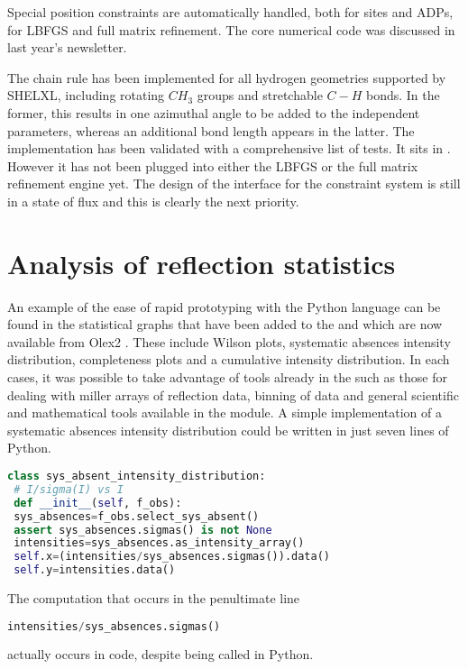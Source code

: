 \documentclass[12pt]{article}
\begin{document}
Special position constraints are automatically handled, both for sites and ADPs, for LBFGS and full matrix refinement. The core numerical code was discussed in last year's \cctbx newsletter.

The chain rule has been implemented for all hydrogen geometries supported by SHELXL, including rotating $CH_3$ groups and stretchable $C-H$ bonds. In the former, this results in one azimuthal angle to be added to the independent parameters, whereas an additional bond length appears in the latter. The implementation has been validated with a comprehensive list of tests. It sits in . However it has not been plugged into either the LBFGS or the full matrix refinement engine yet. The design of the interface for the constraint system is still in a state of flux and this is clearly the next priority.


\section{Analysis of reflection statistics}

An example of the ease of rapid prototyping with the Python language can be found in the statistical graphs that have been added to the \cctbx and which are now available from Olex2 \cite{Dolomanov:2009}. These include Wilson plots, systematic absences intensity distribution, completeness plots and a cumulative intensity distribution. In each cases, it was possible to take advantage of tools already in the \cctbx such as those for dealing with miller arrays of reflection data, binning of data and general scientific and mathematical tools available in the \scitbx module.
A simple implementation of a systematic absences intensity distribution could be written in just seven lines of Python.

\begin{lstlisting}[language=Python]
class sys_absent_intensity_distribution: 
 # I/sigma(I) vs I
 def __init__(self, f_obs):
 sys_absences=f_obs.select_sys_absent()
 assert sys_absences.sigmas() is not None
 intensities=sys_absences.as_intensity_array()
 self.x=(intensities/sys_absences.sigmas()).data()
 self.y=intensities.data()
\end{lstlisting}

The computation that occurs in the penultimate line
\begin{lstlisting}[language=Python]
intensities/sys_absences.sigmas()
\end{lstlisting}
actually occurs in \cpp code, despite being called in Python.
\end{document}
